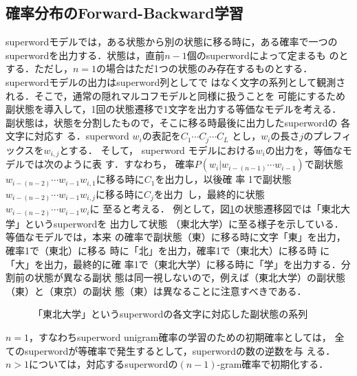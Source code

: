 \subsection{確率分布のForward-Backward学習}
superwordモデルでは，ある状態から別の状態に移る時に，ある確率で一つの
superwordを出力する．状態は，直前\(n-1\)個のsuperwordによって定まるも
のとする．ただし，\(n=1\)の場合はただ1つの状態のみ存在するものとする．
superwordモデルの出力はsuperword列としてで\break
はなく文字の系列として観測さ
れる．そこで，通常の隠れマルコフモデルと同様に扱うことを\break
可能にするため
副状態を導入して，1回の状態遷移で1文字を出力する等価なモデルを考える．\break
副状態は，状態を分割したもので，そこに移る時最後に出力したsuperwordの
各文字に対応す\break
る．superword \(w_i\)の表記を\(C_1\cdots C_j\cdots C_L\)
とし，\(w_i\)の長さ$j$のプレフィックスを\(w_{i,j}\)とする．\break
そして，
superword モデルにおける\(w_i\)の出力を，等価なモデルでは次のように表
す．すなわち，\break
確率\(P(w_i|w_{i-(n-1)}\cdots w_{i-1})\)で副状態
\(w_{i-(n-2)}\cdots w_{i-1}w_{i,1}\)に移る時に\(C_1\)を出力し，以後確
率\break
1で副状態\(w_{i-(n-2)}\cdots w_{i-1}w_{i,j}\)\mbox{に移る時に\(C_j\)を出力
し，最終的に状態\break
\(w_{i-(n-2)}\cdots w_{i-1}w_i\)に}\break
至ると考える．
例として，図\ref{fig4-1}の状態遷移図では「東北大学」というsuperwordを
出力して状態\break
（東北大学）に至る様子を示している．等価なモデルでは，本来
の確率で副状態（東）に移る時に文字「東」を出力，確率1で（東北）に移る
時に「北」を出力，確率1で（東北大）に移る時\break
に「大」を出力，最終的に確
率1で（東北大学）に移る時に「学」を出力する．分割前の状態が異なる副状
態は同一視しないので，例えば（東北大学）の副状態（東）と（東京）の副状
態（東）は異なることに注意すべきである．

\begin{figure}
\begin{center}
\caption{「東北大学」というsuperwordの各文字に対応した副状態の系列}
\label{fig4-1}
\end{center}
\end{figure}

\(n=1\)，すなわちsuperword unigram確率の学習のための初期確率としては，
全てのsuperwordが等確率で発生するとして，superwordの数の逆数を与
える．
\(n>1\)については，対応するsuperwordの\((n-1)\)-gram確率で初期化する．

